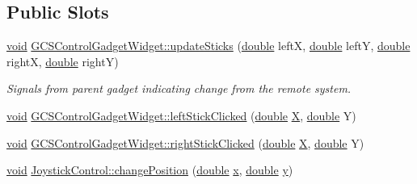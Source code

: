 \subsection*{Public Slots}
\begin{DoxyCompactItemize}
\item 
\hyperlink{group___u_a_v_objects_plugin_ga444cf2ff3f0ecbe028adce838d373f5c}{void} \hyperlink{group___g_c_s_control_gadget_plugin_ga279299922ac5990f798325ad238ae58a}{G\-C\-S\-Control\-Gadget\-Widget\-::update\-Sticks} (\hyperlink{_super_l_u_support_8h_a8956b2b9f49bf918deed98379d159ca7}{double} left\-X, \hyperlink{_super_l_u_support_8h_a8956b2b9f49bf918deed98379d159ca7}{double} left\-Y, \hyperlink{_super_l_u_support_8h_a8956b2b9f49bf918deed98379d159ca7}{double} right\-X, \hyperlink{_super_l_u_support_8h_a8956b2b9f49bf918deed98379d159ca7}{double} right\-Y)
\begin{DoxyCompactList}\small\item\em Signals from parent gadget indicating change from the remote system. \end{DoxyCompactList}\item 
\hyperlink{group___u_a_v_objects_plugin_ga444cf2ff3f0ecbe028adce838d373f5c}{void} \hyperlink{group___g_c_s_control_gadget_plugin_ga04d9e7c1a62eff3012500caccbde66d8}{G\-C\-S\-Control\-Gadget\-Widget\-::left\-Stick\-Clicked} (\hyperlink{_super_l_u_support_8h_a8956b2b9f49bf918deed98379d159ca7}{double} \hyperlink{_parse_e_k_f_log_8m_ac51b57a703ba1c5869228690c93e1701}{X}, \hyperlink{_super_l_u_support_8h_a8956b2b9f49bf918deed98379d159ca7}{double} Y)
\item 
\hyperlink{group___u_a_v_objects_plugin_ga444cf2ff3f0ecbe028adce838d373f5c}{void} \hyperlink{group___g_c_s_control_gadget_plugin_gab69d624dde0231e33d3a5bb6d4d769fa}{G\-C\-S\-Control\-Gadget\-Widget\-::right\-Stick\-Clicked} (\hyperlink{_super_l_u_support_8h_a8956b2b9f49bf918deed98379d159ca7}{double} \hyperlink{_parse_e_k_f_log_8m_ac51b57a703ba1c5869228690c93e1701}{X}, \hyperlink{_super_l_u_support_8h_a8956b2b9f49bf918deed98379d159ca7}{double} Y)
\item 
\hyperlink{group___u_a_v_objects_plugin_ga444cf2ff3f0ecbe028adce838d373f5c}{void} \hyperlink{group___g_c_s_control_gadget_plugin_ga38032aee1ab31edefa56c0274624604c}{Joystick\-Control\-::change\-Position} (\hyperlink{_super_l_u_support_8h_a8956b2b9f49bf918deed98379d159ca7}{double} \hyperlink{glext_8h_a1db9d104e3c2128177f26aff7b46982f}{x}, \hyperlink{_super_l_u_support_8h_a8956b2b9f49bf918deed98379d159ca7}{double} \hyperlink{glext_8h_a42315f3ed8fff752bb47fd782309fcfc}{y})

\end{DoxyCompactItemize}
